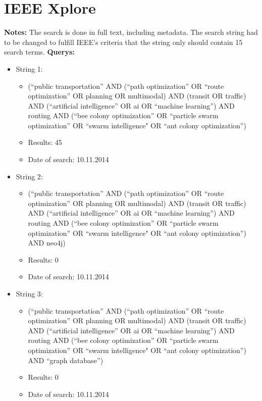 \section{IEEE Xplore}
\par \textbf{Notes:} The search is done in full text, including metadata. The search string had to be changed to fulfill IEEE's criteria that the string only should contain 15 search terms.  
\textbf{Querys:}
\begin{itemize}
	\item String 1: 
	\begin{itemize}
		\item(``public transportation'' AND (``path optimization'' OR ``route optimization'' OR planning OR multimodal) AND (transit OR traffic) AND (``artificial intelligence'' OR ai OR ``machine learning'') AND routing AND (``bee colony optimization'' OR ``particle swarm optimization'' OR ``swarm intelligence" OR ``ant colony optimization'')
		\item Results: 45
		\item Date of search: 10.11.2014
	\end{itemize}
	\item String 2:
	\begin{itemize}
		\item(``public transportation'' AND (``path optimization'' OR ``route optimization'' OR planning OR multimodal) AND (transit OR traffic) AND (``artificial intelligence'' OR ai OR ``machine learning'') AND routing AND (``bee colony optimization'' OR ``particle swarm optimization'' OR ``swarm intelligence" OR ``ant colony optimization'') AND neo4j)
		\item Results: 0
		\item Date of search: 10.11.2014
	\end{itemize}
	\item String 3:
	\begin{itemize}
		\item(``public transportation'' AND (``path optimization'' OR ``route optimization'' OR planning OR multimodal) AND (transit OR traffic) AND (``artificial intelligence'' OR ai OR ``machine learning'') AND routing AND (``bee colony optimization'' OR ``particle swarm optimization'' OR ``swarm intelligence" OR ``ant colony optimization'') AND ``graph database'')
		\item Results: 0
		\item Date of search: 10.11.2014
	\end{itemize}
\end{itemize}

